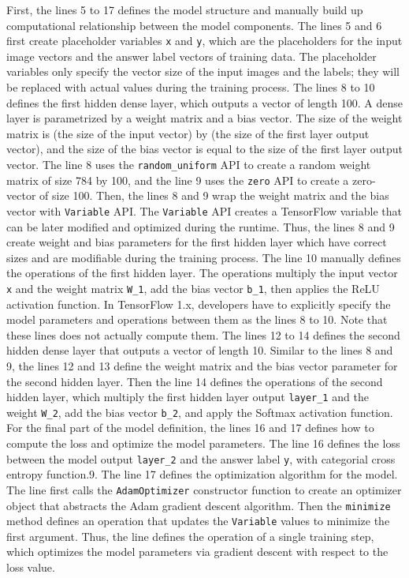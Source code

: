 First, the lines 5 to 17 defines the model structure and manually build up
computational relationship between the model components.
The lines 5 and 6 first create placeholder variables {\tt x} and {\tt y},
which are the placeholders for the input image vectors 
and the answer label vectors of training data.
The placeholder variables only specify the vector size of the input images
and the labels; they will be replaced with actual values during the training
process. 
The lines 8 to 10 defines the first hidden dense layer, which outputs a
vector of length 100.
A dense layer is parametrized by a weight matrix and a bias vector.
The size of the weight matrix is (the size of the input vector) by 
(the size of the first layer output vector), and the size of the bias vector
is equal to the size of the first layer output vector.
The line 8 uses the {\tt random\_uniform} API to create a random weight matrix of
size 784 by 100, and the line 9 uses the {\tt zero} API to create a zero-vector
of size 100.
Then, the lines 8 and 9 wrap the weight matrix and the bias vector with
{\tt Variable} API.
The {\tt Variable} API creates a TensorFlow variable that can be later modified
and optimized during the runtime.
Thus, the lines 8 and 9 create weight and bias parameters for the first
hidden layer which have correct sizes and are modifiable during the 
training process.
The line 10 manually defines the operations of the first hidden layer. 
The operations multiply the input vector {\tt x} and the weight matrix 
{\tt W\_1}, add the bias vector {\tt b\_1}, then applies the ReLU activation
function.
In TensorFlow 1.x, developers have to explicitly specify the model parameters
and operations between them as the lines 8 to 10.
Note that these lines does not actually compute them.
The lines 12 to 14 defines the second hidden dense layer that outputs a
vector of length 10.
Similar to the lines 8 and 9, the lines 12 and 13 define the weight matrix
and the bias vector parameter for the second hidden layer.
Then the line 14 defines the operations of the second hidden layer,
which multiply the first hidden layer output {\tt layer\_1} and
the weight {\tt W\_2}, add the bias vector {\tt b\_2}, and apply the
Softmax activation function.
For the final part of the model definition,
the lines 16 and 17 defines how to compute the loss and optimize the model
parameters.
The line 16 defines the loss between the model output {\tt layer\_2} and
the answer label {\tt y}, with categorial cross entropy function.9.
The line 17 defines the optimization algorithm for the model.
The line first calls the {\tt AdamOptimizer} constructor
function to create an optimizer object that abstracts the
Adam gradient descent algorithm.
Then the {\tt minimize} method defines an operation that updates the
{\tt Variable} values to minimize the first argument.
Thus, the line defines the operation of a single training step,
which optimizes the model parameters via gradient descent with respect to
the loss value.

